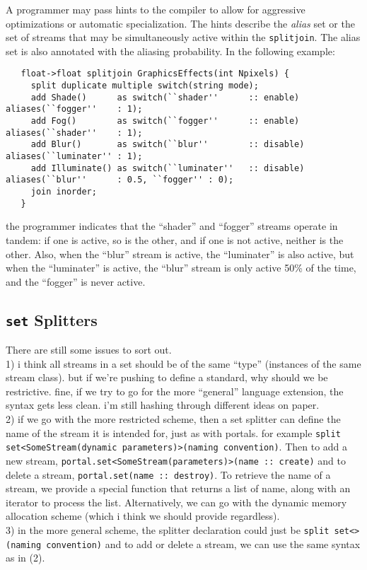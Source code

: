 \documentclass{tr}
\begin{document}
A programmer  may pass hints to  the compiler to  allow for aggressive
optimizations or automatic specialization. The hints describe the {\it
alias} set  or the  set of streams  that may be  simultaneously active
within the \verb+splitjoin+. The alias  set is also annotated with the
aliasing probability. In the following example:
\begin{verbatim}
   float->float splitjoin GraphicsEffects(int Npixels) {
     split duplicate multiple switch(string mode);
     add Shade()      as switch(``shader''      :: enable)  aliases(``fogger''    : 1);
     add Fog()        as switch(``fogger''      :: enable)  aliases(``shader''    : 1);
     add Blur()       as switch(``blur''        :: disable) aliases(``luminater'' : 1);
     add Illuminate() as switch(``luminater''   :: disable) aliases(``blur''      : 0.5, ``fogger'' : 0);
     join inorder;
   }
\end{verbatim}
the programmer  indicates that  the ``shader'' and  ``fogger'' streams
operate in tandem:  if one is active,  so is the other, and  if one is
not active,  neither is the other.  Also, when the  ``blur'' stream is
active, the  ``luminater'' is also active, but  when the ``luminater''
is active,  the ``blur'' stream is  only active 50\% of  the time, and
the ``fogger'' is never active.


\subsection {\texttt{set} Splitters}

There are still some issues to sort out.\\
1) i think all streams in a set should be of the same ``type''
(instances of the same stream class). but if we're pushing to define a
standard, why should we be restrictive. fine, if we try to go for the
more ``general'' language extension, the syntax gets less clean. i'm
still hashing through different ideas on paper.\\
2) if we go with the more restricted scheme, then a set splitter can
define the name of the stream it is intended for, just as with
portals. for example
\verb+split set<SomeStream(dynamic parameters)>(naming convention)+. Then to add a
new stream,
\verb+portal.set<SomeStream(parameters)>(name :: create)+ and to delete a
stream,
\verb+portal.set(name :: destroy)+. To retrieve the name of a stream, we provide
a special function that returns a list of name, along with an iterator
to process the list. Alternatively, we can go with the dynamic memory
allocation scheme (which i think we should provide regardless).\\
3) in the more general scheme, the splitter declaration could just be
\verb+split set<>(naming convention)+ and to add or delete a stream, we
can use the same syntax as in (2).
\end{document}
